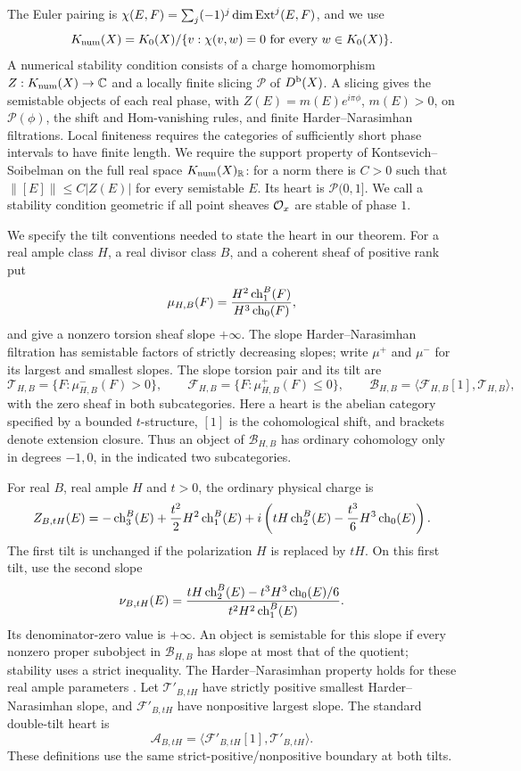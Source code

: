 The Euler pairing is
$\chi(E,F)=\sum_j(-1)^j\dim\operatorname{Ext}^j(E,F)$, and we use
\[
 K_{\mathrm{num}}(X)=K_0(X)/\{v:\chi(v,w)=0\text{ for every }w\in K_0(X)\}.
\]
A numerical stability condition consists of a charge homomorphism
$Z:K_{\mathrm{num}}(X)\to\mathbb C$ and a locally finite slicing $\mathcal P$ of
$D^{\mathrm b}(X)$. A slicing gives the semistable objects of each real phase,
with $Z(E)=m(E)e^{i\pi\phi}$, $m(E)>0$, on $\mathcal P(\phi)$,
the shift and Hom-vanishing rules, and finite Harder--Narasimhan
filtrations. Local finiteness requires the categories of sufficiently
short phase intervals to have finite length. We require the support
property of Kontsevich--Soibelman
\cite[Sections~1.2 and~2.1]{KontsevichSoibelman2008} on the full real space
$K_{\mathrm{num}}(X)_{\mathbb R}$: for a norm there is $C>0$ such that
$\|[E]\|\leq C|Z(E)|$ for every semistable $E$.
Its heart is $\mathcal P(0,1]$. We call a stability condition geometric
if all point sheaves $\mathcal O_x$ are stable of phase $1$.

We specify the tilt conventions needed to state the heart in our theorem.
For a real ample class $H$, a real divisor class $B$, and a coherent sheaf
of positive rank put
\[
 \mu_{H,B}(F)=\frac{H^2\operatorname{ch}_1^B(F)}{H^3\operatorname{ch}_0(F)},
\]
and give a nonzero torsion sheaf slope $+\infty$.
The slope Harder--Narasimhan filtration has semistable factors of strictly
decreasing slopes; write $\mu^+$ and $\mu^-$ for its largest and smallest
slopes. The slope torsion pair and its tilt are
\[
 \mathcal T_{H,B}=\{F:\mu^-_{H,B}(F)>0\},\qquad
 \mathcal F_{H,B}=\{F:\mu^+_{H,B}(F)\leq0\},\qquad
 \mathcal B_{H,B}=\langle\mathcal F_{H,B}[1],\mathcal T_{H,B}\rangle,
\]
with the zero sheaf in both subcategories. Here a heart is the abelian
category specified by a bounded $t$-structure, $[1]$ is the cohomological
shift, and brackets denote extension closure. Thus an object of
$\mathcal B_{H,B}$ has ordinary cohomology only in degrees $-1,0$, in the
indicated two subcategories.

For real $B$, real ample $H$ and $t>0$, the ordinary physical charge is
\begin{equation}\label{eq:intro-physical}
 Z_{B,tH}(E)=
 -\operatorname{ch}_3^B(E)+\frac{t^2}{2}H^2\operatorname{ch}_1^B(E)
 +i\left(tH\operatorname{ch}_2^B(E)-\frac{t^3}{6}H^3\operatorname{ch}_0(E)\right).
\end{equation}
The first tilt is unchanged if the polarization $H$ is replaced by
$tH$. On this first tilt, use the second slope
\[
 \nu_{B,tH}(E)=
 \frac{tH\operatorname{ch}_2^B(E)-t^3H^3\operatorname{ch}_0(E)/6}{t^2H^2\operatorname{ch}_1^B(E)}.
\]
Its denominator-zero value is $+\infty$. An object is semistable for
this slope if every nonzero proper subobject in $\mathcal B_{H,B}$ has
slope at most that of the quotient; stability uses a strict inequality.
The Harder--Narasimhan property holds for these real ample parameters
\cite[Section~2]{BMS2016}. Let $\mathcal T'_{B,tH}$
have strictly positive smallest Harder--Narasimhan slope, and
$\mathcal F'_{B,tH}$ have nonpositive largest slope. The standard
double-tilt heart is
\[
 \mathcal A_{B,tH}=
 \langle\mathcal F'_{B,tH}[1],\mathcal T'_{B,tH}\rangle.
\]
These definitions use the same strict-positive/nonpositive boundary
at both tilts.

